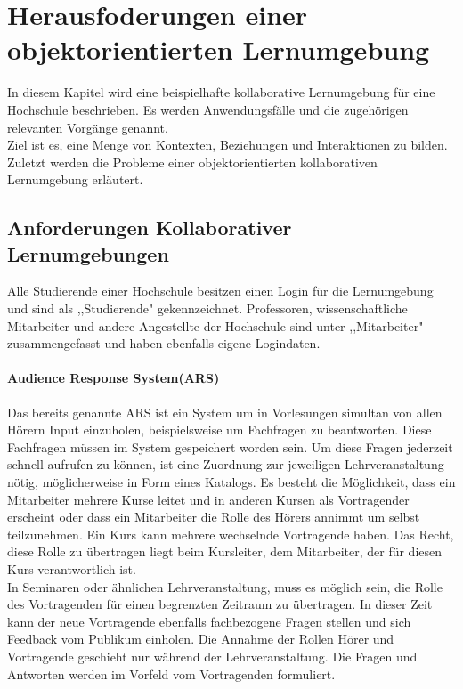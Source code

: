 \documentclass[conference]{IEEEtran}
\begin{document}
\section{Herausfoderungen einer objektorientierten Lernumgebung}
In diesem Kapitel wird eine beispielhafte kollaborative Lernumgebung für eine Hochschule beschrieben. Es werden Anwendungsfälle und die zugehörigen relevanten Vorgänge genannt. \\
Ziel ist es, eine Menge von Kontexten, Beziehungen und Interaktionen zu bilden. Zuletzt werden die Probleme einer objektorientierten kollaborativen Lernumgebung erläutert.

\subsection{Anforderungen Kollaborativer Lernumgebungen} 
Alle Studierende einer Hochschule besitzen einen Login für die Lernumgebung und sind als ,,Studierende" gekennzeichnet. Professoren, wissenschaftliche Mitarbeiter und andere Angestellte der Hochschule sind unter ,,Mitarbeiter" zusammengefasst und haben ebenfalls eigene Logindaten.
 \paragraph{Audience Response System(ARS)} Das bereits genannte ARS ist ein System um in Vorlesungen simultan von allen Hörern Input einzuholen, beispielsweise um Fachfragen zu beantworten. Diese Fachfragen müssen im System gespeichert worden sein. Um diese Fragen jederzeit schnell aufrufen zu können, ist eine Zuordnung zur jeweiligen Lehrveranstaltung nötig, möglicherweise in Form eines Katalogs. Es besteht die Möglichkeit, dass ein Mitarbeiter mehrere Kurse leitet und in anderen Kursen als Vortragender erscheint oder dass ein Mitarbeiter die Rolle des Hörers annimmt um selbst teilzunehmen. Ein Kurs kann mehrere wechselnde Vortragende haben. Das Recht, diese Rolle zu übertragen liegt beim Kursleiter, dem Mitarbeiter, der für diesen Kurs verantwortlich ist.\\ In Seminaren oder ähnlichen Lehrveranstaltung, muss es möglich sein, die Rolle des Vortragenden für einen begrenzten Zeitraum zu übertragen. In dieser Zeit kann der neue Vortragende ebenfalls fachbezogene Fragen stellen und sich Feedback vom Publikum einholen. Die Annahme der Rollen Hörer und Vortragende geschieht nur während der Lehrveranstaltung. Die Fragen und Antworten werden im Vorfeld vom Vortragenden formuliert.
\end{document}
